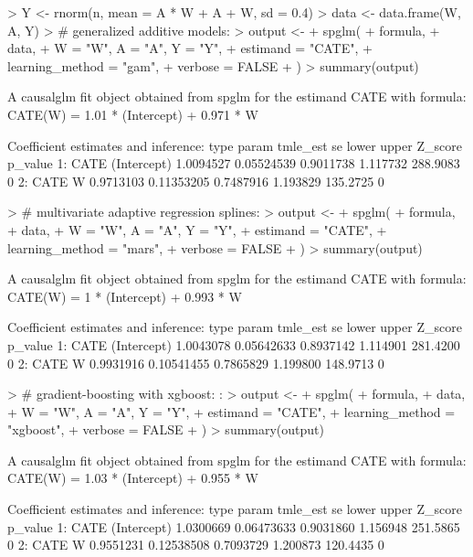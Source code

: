 \documentclass[article]{jss}
\begin{document}
\begin{Schunk}
\begin{Sinput}
> Y <- rnorm(n, mean = A * W + A + W, sd = 0.4)
> data <- data.frame(W, A, Y)
> # generalized additive models:
> output <-
+   spglm(
+     formula,
+     data,
+     W = "W", A = "A", Y = "Y",
+     estimand = "CATE",
+     learning_method = "gam",
+     verbose = FALSE
+   )
> summary(output)
\end{Sinput}
\begin{Soutput}
A causalglm fit object obtained from spglm for the estimand CATE with formula: 
CATE(W) = 1.01 * (Intercept) + 0.971 * W

Coefficient estimates and inference:
   type       param  tmle_est         se     lower    upper  Z_score p_value
1: CATE (Intercept) 1.0094527 0.05524539 0.9011738 1.117732 288.9083       0
2: CATE           W 0.9713103 0.11353205 0.7487916 1.193829 135.2725       0
\end{Soutput}
\begin{Sinput}
> # multivariate adaptive regression splines:
> output <-
+   spglm(
+     formula,
+     data,
+     W = "W", A = "A", Y = "Y",
+     estimand = "CATE",
+     learning_method = "mars",
+     verbose = FALSE
+   )
> summary(output)
\end{Sinput}
\begin{Soutput}
A causalglm fit object obtained from spglm for the estimand CATE with formula: 
CATE(W) = 1 * (Intercept) + 0.993 * W

Coefficient estimates and inference:
   type       param  tmle_est         se     lower    upper  Z_score p_value
1: CATE (Intercept) 1.0043078 0.05642633 0.8937142 1.114901 281.4200       0
2: CATE           W 0.9931916 0.10541455 0.7865829 1.199800 148.9713       0
\end{Soutput}
\begin{Sinput}
> # gradient-boosting with xgboost: :
> output <-
+   spglm(
+     formula,
+     data,
+     W = "W", A = "A", Y = "Y",
+     estimand = "CATE",
+     learning_method = "xgboost",
+     verbose = FALSE
+   )
> summary(output)
\end{Sinput}
\begin{Soutput}
A causalglm fit object obtained from spglm for the estimand CATE with formula: 
CATE(W) = 1.03 * (Intercept) + 0.955 * W

Coefficient estimates and inference:
   type       param  tmle_est         se     lower    upper  Z_score p_value
1: CATE (Intercept) 1.0300669 0.06473633 0.9031860 1.156948 251.5865       0
2: CATE           W 0.9551231 0.12538508 0.7093729 1.200873 120.4435       0
\end{Soutput}
\end{Schunk}
\end{document}
